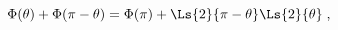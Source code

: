 \begin{equation}
\label{sym_Phi}
\Phi(\theta) + \Phi(\pi-\theta) 
= \Phi(\pi) + \Ls{2}{\pi-\theta} \Ls{2}{\theta} \;, 
\end{equation}

